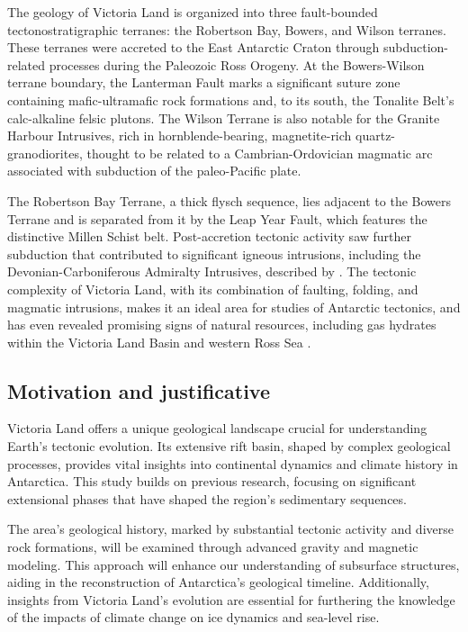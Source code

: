 \documentclass{article}
\begin{document}
	The geology of Victoria Land is organized into three fault-bounded tectonostratigraphic terranes: 
	the Robertson Bay, Bowers, and Wilson terranes. These terranes were accreted to the East Antarctic Craton 
	through subduction-related processes during the Paleozoic Ross Orogeny. At the Bowers-Wilson terrane boundary, 
	the Lanterman Fault marks a significant suture zone containing mafic-ultramafic rock formations and, 
	to its south, the Tonalite Belt’s calc-alkaline felsic plutons. The Wilson Terrane is also notable 
	for the Granite Harbour Intrusives, rich in hornblende-bearing, magnetite-rich quartz-granodiorites, 
	thought to be related to a Cambrian-Ordovician magmatic arc associated with subduction of the 
	paleo-Pacific plate.
	
	The Robertson Bay Terrane, a thick flysch sequence, lies adjacent to the Bowers Terrane 
	and is separated from it by the Leap Year Fault, which features the distinctive Millen Schist belt. 
	Post-accretion tectonic activity saw further subduction that contributed to significant 
	igneous intrusions, including the Devonian-Carboniferous Admiralty Intrusives, described by 
	\citet{Ferraccioli2002}. The tectonic complexity of Victoria Land, with its combination 
	of faulting, folding, and magmatic intrusions, makes it an ideal area for studies of Antarctic 
	tectonics, and has even revealed promising signs of natural resources, including gas hydrates 
	within the Victoria Land Basin and western Ross Sea \citep{Geletti2011}.

	\subsection{Motivation and justificative}
	\label{ssec:intro_motivation}

	Victoria Land offers a unique geological landscape crucial for understanding Earth’s tectonic evolution. 
	Its extensive rift basin, shaped by complex geological processes, provides vital insights into continental 
	dynamics and climate history in Antarctica. This study builds on previous research, focusing on significant 
	extensional phases that have shaped the region's sedimentary sequences.
	
	The area’s geological history, marked by substantial tectonic activity and diverse rock formations, 
	will be examined through advanced gravity and magnetic modeling. This approach will enhance our understanding 
	of subsurface structures, aiding in the reconstruction of Antarctica’s geological timeline. 
	Additionally, insights from Victoria Land’s evolution are essential for furthering the knowledge of the 
	impacts of climate change on ice dynamics and sea-level rise.
			
\end{document}
